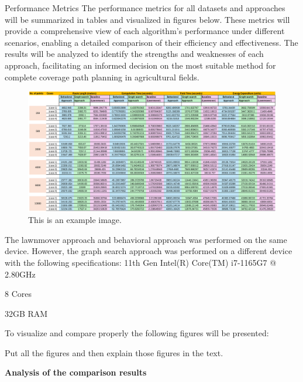 \vspace*{6mm}   

Performance Metrics
The performance metrics for all datasets and approaches will be summarized in tables and visualized in figures below. These metrics will provide a comprehensive view of each algorithm's performance under different scenarios, enabling a detailed comparison of their efficiency and effectiveness. The results will be analyzed to identify the strengths and weaknesses of each approach, facilitating an informed decision on the most suitable method for complete coverage path planning in agricultural fields.

\begin{figure}[htbp]
    \centering
    \includegraphics[width=\textwidth]{experimental_data/new_table_image.png}
    \caption{This is an example image.}
    \label{fig:example_image}
\end{figure}


\vspace*{6mm}

The lawnmover approach and behavioral approach was performed on the same device. However, the graph search approach was performed on a different device with the following specifications:
11th Gen Intel(R) Core(TM) i7-1165G7 @ 2.80GHz

8 Cores

32GB RAM

\vspace*{6mm}

To visualize and compare properly the following figures will be presented:

Put all the figures and then explain those figures in the text.

\textbf{Analysis of the comparison results}  


